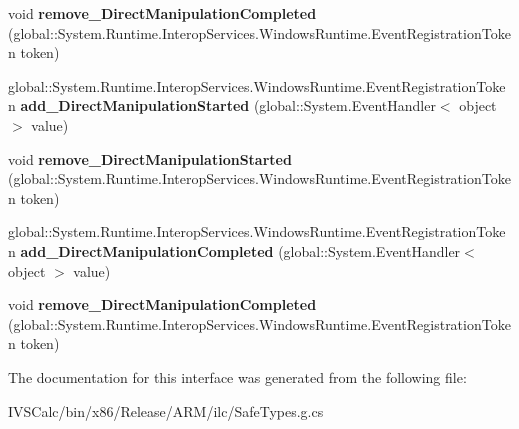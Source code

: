\begin{DoxyCompactItemize}
void {\bfseries remove\+\_\+\+Direct\+Manipulation\+Completed} (global\+::\+System.\+Runtime.\+Interop\+Services.\+Windows\+Runtime.\+Event\+Registration\+Token token)
\item 
\mbox{\label{interface_windows_1_1_u_i_1_1_xaml_1_1_controls_1_1_i_scroll_viewer3_a0839b9502b9866f437c3f3f23c2c0f79}} 
global\+::\+System.\+Runtime.\+Interop\+Services.\+Windows\+Runtime.\+Event\+Registration\+Token {\bfseries add\+\_\+\+Direct\+Manipulation\+Started} (global\+::\+System.\+Event\+Handler$<$ object $>$ value)
\item 
\mbox{\label{interface_windows_1_1_u_i_1_1_xaml_1_1_controls_1_1_i_scroll_viewer3_a75d6c9a9bf666134494a9293cd9bfa83}} 
void {\bfseries remove\+\_\+\+Direct\+Manipulation\+Started} (global\+::\+System.\+Runtime.\+Interop\+Services.\+Windows\+Runtime.\+Event\+Registration\+Token token)
\item 
\mbox{\label{interface_windows_1_1_u_i_1_1_xaml_1_1_controls_1_1_i_scroll_viewer3_a111ec1d571f2a6f03d6e721b6314de30}} 
global\+::\+System.\+Runtime.\+Interop\+Services.\+Windows\+Runtime.\+Event\+Registration\+Token {\bfseries add\+\_\+\+Direct\+Manipulation\+Completed} (global\+::\+System.\+Event\+Handler$<$ object $>$ value)
\item 
\mbox{\label{interface_windows_1_1_u_i_1_1_xaml_1_1_controls_1_1_i_scroll_viewer3_ac49adea893c6168aba5af298913c0b69}} 
void {\bfseries remove\+\_\+\+Direct\+Manipulation\+Completed} (global\+::\+System.\+Runtime.\+Interop\+Services.\+Windows\+Runtime.\+Event\+Registration\+Token token)
\end{DoxyCompactItemize}


The documentation for this interface was generated from the following file\+:\begin{DoxyCompactItemize}
\item 
I\+V\+S\+Calc/bin/x86/\+Release/\+A\+R\+M/ilc/Safe\+Types.\+g.\+cs\end{DoxyCompactItemize}
